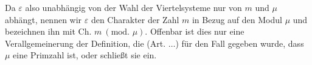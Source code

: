 Da $\varepsilon$ also unabhängig von der Wahl der Viertelsysteme nur von $m$ und $\mu$ abhängt, nennen wir $\varepsilon$ den Charakter der Zahl $m$ in Bezug auf den Modul $\mu$ und bezeichnen ihn mit $\text{Ch. }m\ (\text{mod. }\mu)$. Offenbar ist dies nur eine Verallgemeinerung der Definition, die (Art. $\ldots$) für den Fall gegeben wurde, dass $\mu$ eine Primzahl ist, oder schließt sie ein.
